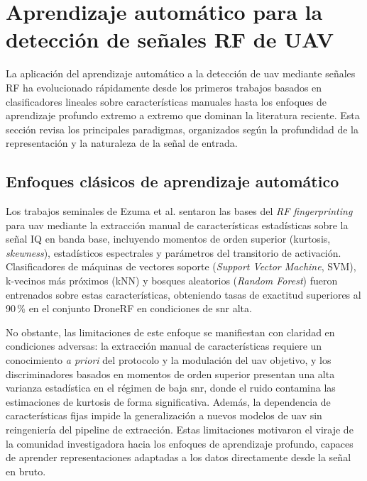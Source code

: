 \section{Aprendizaje automático para la detección de señales RF de UAV}
\label{sec:ml_deteccion_rf}

La aplicación del aprendizaje automático a la detección de \gls{uav} mediante señales
RF ha evolucionado rápidamente desde los primeros trabajos basados en clasificadores
lineales sobre características manuales hasta los enfoques de aprendizaje profundo
extremo a extremo que dominan la literatura reciente. Esta sección revisa los
principales paradigmas, organizados según la profundidad de la representación y la
naturaleza de la señal de entrada.

\subsection{Enfoques clásicos de aprendizaje automático}
\label{subsec:ml_clasico}

Los trabajos seminales de Ezuma et al. \cite{ezuma_micro-uav_2019, ezuma_detection_2020}
sentaron las bases del \textit{RF fingerprinting} para \gls{uav} mediante la extracción
manual de características estadísticas sobre la señal IQ en banda base, incluyendo
momentos de orden superior (kurtosis, \textit{skewness}), estadísticos espectrales
y parámetros del transitorio de activación. Clasificadores de máquinas de vectores
soporte (\textit{Support Vector Machine}, SVM), k-vecinos más próximos (kNN) y
bosques aleatorios (\textit{Random Forest}) fueron entrenados sobre estas
características, obteniendo tasas de exactitud superiores al 90\,\% en el conjunto
DroneRF en condiciones de \gls{snr} alta.

No obstante, las limitaciones de este enfoque se manifiestan con claridad en
condiciones adversas: la extracción manual de características requiere un conocimiento
\textit{a priori} del protocolo y la modulación del \gls{uav} objetivo, y los
discriminadores basados en momentos de orden superior presentan una alta varianza
estadística en el régimen de baja \gls{snr}, donde el ruido contamina las estimaciones
de kurtosis de forma significativa. Además, la dependencia de características fijas
impide la generalización a nuevos modelos de \gls{uav} sin reingeniería del pipeline de
extracción. Estas limitaciones motivaron el viraje de la comunidad investigadora
hacia los enfoques de aprendizaje profundo, capaces de aprender representaciones
adaptadas a los datos directamente desde la señal en bruto.

